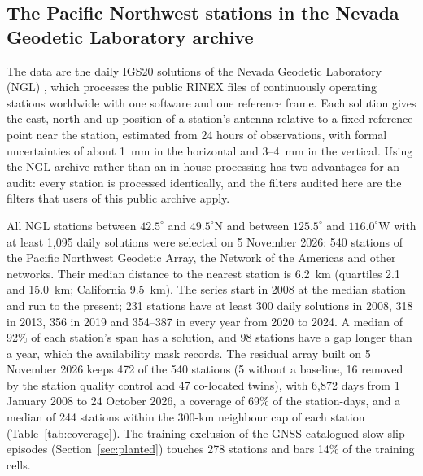 \documentclass[preprint,12pt,authoryear]{elsarticle}
\begin{document}
\subsection{The Pacific Northwest stations in the Nevada Geodetic Laboratory archive}

The data are the daily IGS20 solutions of the Nevada Geodetic Laboratory (NGL) \citep{blewitt2018, ngl2026}, which processes the public RINEX files of continuously operating stations worldwide with one software and one reference frame. Each solution gives the east, north and up position of a station's antenna relative to a fixed reference point near the station, estimated from 24 hours of observations, with formal uncertainties of about 1~mm in the horizontal and 3--4~mm in the vertical. Using the NGL archive rather than an in-house processing has two advantages for an audit: every station is processed identically, and the filters audited here are the filters that users of this public archive apply.

All NGL stations between $42.5^\circ$ and $49.5^\circ$N and between $125.5^\circ$ and $116.0^\circ$W with at least 1,095 daily solutions were selected on 5 November 2026: 540 stations of the Pacific Northwest Geodetic Array, the Network of the Americas and other networks. Their median distance to the nearest station is 6.2~km (quartiles 2.1 and 15.0~km; California 9.5~km). The series start in 2008 at the median station and run to the present; 231 stations have at least 300 daily solutions in 2008, 318 in 2013, 356 in 2019 and 354--387 in every year from 2020 to 2024. A median of 92\% of each station's span has a solution, and 98 stations have a gap longer than a year, which the availability mask records. The residual array built on 5 November 2026 keeps 472 of the 540 stations (5 without a baseline, 16 removed by the station quality control and 47 co-located twins), with 6,872 days from 1 January 2008 to 24 October 2026, a coverage of 69\% of the station-days, and a median of 244 stations within the 300-km neighbour cap of each station (Table~\ref{tab:coverage}). The training exclusion of the GNSS-catalogued slow-slip episodes (Section~\ref{sec:planted}) touches 278 stations and bars 14\% of the training cells.
\end{document}
